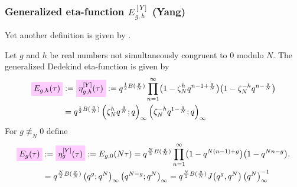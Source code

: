 \documentclass{article}
\begin{document}
\begin{Hemmecke}


\subsubsection{Generalized eta-function $E_{g,h}^{[Y]}$ (Yang)}
Yet another definition is given by
\cite{Yang_GeneralizedDedekindEtaFunctions_2004}.


\begin{Definition}
  \cite{Yang_GeneralizedDedekindEtaFunctions_2004}
  Let $g$ and $h$ be real numbers not simultaneously congruent to 0
  modulo $N$.
%
The generalized Dedekind eta-function is given by
\begin{align}
  \defineNotation[E-g-h-tau]{E_{g,h}(\tau)}
  &:=
  \defineNotation[eta-g-h-tau-Yang]{\eta_{g,h}^{[Y]}(\tau)}
  :=
  q^{\frac{1}{2} B(\frac{g}{N})}
  \prod_{n=1}^\infty
    \bigl(1-\zeta_N^h q^{n-1 + \frac{g}{N}}\bigr)
    \bigl(1-\zeta_N^{-h} q^{n - \frac{g}{N}}\bigr)
  \notag\\
  &=
  q^{\frac{1}{2} B(\frac{g}{N})}
    \qPochhammer{\zeta_N^h q^{\frac{g}{N}}}{q}
    \qPochhammer{\zeta_N^{-h} q^{1-\frac{g}{N}}}{q}
  \label{eq:eta_g-h^[Y](tau)}
\end{align}
For $g \not\equiv_N 0$ define
\begin{align}
  \defineNotation[E-g-tau]{E_g(\tau)}
  &:=
  \defineNotation[eta-g-tau-Yang]{\eta_g^{[Y]}(\tau)}
  :=
  E_{g,0}(N \tau)
  =
  q^{\frac{N}{2} B(\frac{g}{N})}
  \prod_{n=1}^\infty
    \bigl(1-q^{N (n-1) + g}\bigr)
    \bigl(1-q^{N n - g}\bigr).
  \notag\\
  &=
  q^{\frac{N}{2} B(\frac{g}{N})}
    \qPochhammer{q^g}{q^N}
    \qPochhammer{q^{N-g}}{q^N}
  =
  q^{\frac{N}{2} B(\frac{g}{N})}
  \jacobiFunction{q^g}{q^N} \eulerFunction{N}^{-1}
  \label{eq:eta_g^[Y](tau)}
\end{align}
\end{Definition}




\end{Hemmecke}
\end{document}
